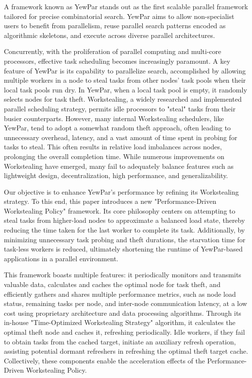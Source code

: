 \documentclass{mproj}
\begin{document}
A framework known as YewPar\cite{10.1145/3332466.3374537} stands out as the first scalable parallel framework tailored for precise combinatorial search.
YewPar aims to allow non-specialist users to benefit from parallelism,
reuse parallel search patterns encoded as algorithmic skeletons,
and execute across diverse parallel architectures.

Concurrently, with the proliferation of parallel computing and multi-core processors, effective task scheduling becomes increasingly paramount.
A key feature of YewPar is its capability to parallelize search, accomplished by allowing multiple workers in a node to steal tasks from other nodes' task pools when their local task pools run dry.
In YewPar, when a local task pool is empty, it randomly selects nodes for task theft.
Workstealing, a widely researched and implemented parallel scheduling strategy, permits idle processors to "steal" tasks from their busier counterparts.
However, many internal Workstealing schedulers, like YewPar, tend to adopt a somewhat random theft approach, often leading to unnecessary overhead, latency, and a vast amount of time spent in probing for tasks to steal.
This often results in relative load imbalances across nodes, prolonging the overall completion time.
While numerous improvements on Workstealing have emerged, many fail to adequately balance features such as lightweight design, decentralization, high performance, and generalizability.

Our objective is to enhance YewPar's performance by refining its Workstealing strategy.
To this end, this paper introduces a new "Performance-Driven Workstealing Policy" framework.
Its core philosophy centers on attempting to steal tasks from higher-load nodes to approximate a balanced load state, thereby reducing the time taken for the last worker to complete its task.
Additionally, by minimizing unnecessary task probing and theft durations, the starvation time for task-less workers is reduced,
ultimately shortening the runtime of YewPar-based applications in a parallel environment.

This framework boasts multiple features:
it periodically monitors and transmits valuable data,
calculates and caches the optimal node for task theft,
and efficiently gathers and shares multiple performance metrics, such as node load status, remaining tasks per node, and inter-node communication latency, at a low cost using proprietary architecture and data processing algorithms.
Through its in-house "Time-Optimized Workstealing Strategy" algorithm, it calculates the optimal theft node and caches it, refreshing periodically.
Idle workers, if they fail to obtain tasks from the cached target, initiate an auxiliary refresh operation, assisting potential dormant refreshers in refreshing the optimal theft target cache.
Collectively, these components enable the acceleration effects of the Performance-Driven Workstealing Policy.
\end{document}
